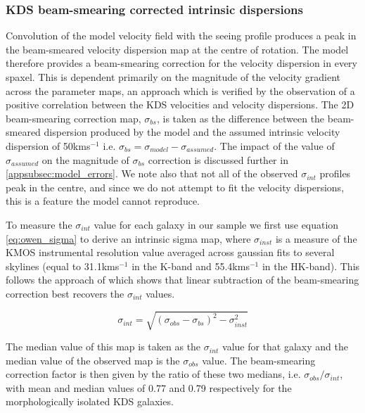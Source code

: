\documentclass[fleqn,usenatbib]{mn2e}
\begin{document}
\subsubsection{KDS beam-smearing corrected intrinsic dispersions}\label{subsubsec:beam_smearing_corrected_dispersions}
Convolution of the model velocity field with the seeing profile produces a peak in the beam-smeared velocity dispersion map at the centre of rotation.
The model therefore provides a beam-smearing correction for the velocity dispersion in every spaxel.
This is dependent primarily on the magnitude of the velocity gradient across the parameter maps, an approach which is verified by the observation of a positive correlation between the KDS velocities and velocity dispersions.
The 2D beam-smearing correction map, $\sigma_{bs}$, is taken as the difference between the beam-smeared dispersion produced by the model and the assumed intrinsic velocity dispersion of 50kms$^{-1}$ i.e. $\sigma_{bs} = \sigma_{model} - \sigma_{assumed}$.
The impact of the value of $\sigma_{assumed}$ on the magnitude of $\sigma_{bs}$ correction is discussed further in \cref{appsubsec:model_errors}.
We note also that not all of the observed $\sigma_{int}$ profiles peak in the centre, and since we do not attempt to fit the velocity dispersions, this is a feature the model cannot reproduce. 

To measure the $\sigma_{int}$ value for each galaxy in our sample we first use equation \ref{eq:owen_sigma} to derive an intrinsic sigma map, where $\sigma_{inst}$ is a measure of the KMOS instrumental resolution value averaged across gaussian fits to several skylines (equal to 31.1kms$^{-1}$ in the K-band and 55.4kms$^{-1}$ in the HK-band).
This follows the approach of \cite{Stott2016} which shows that linear subtraction of the beam-smearing correction best recovers the $\sigma_{int}$ values. 

\begin{equation}\label{eq:owen_sigma}
   \sigma_{int} = \sqrt{\left(\sigma_{obs} - \sigma_{bs} \right)^{2} - \sigma_{inst}^{2}}
\end{equation}

The median value of this map is taken as the $\sigma_{int}$ value for that galaxy and the median value of the observed map is the $\sigma_{obs}$ value.
The beam-smearing correction factor is then given by the ratio of these two medians, i.e. $\sigma_{obs}/\sigma_{int}$, with mean and median values of 0.77 and 0.79 respectively for the morphologically isolated KDS galaxies. \\
\end{document}
